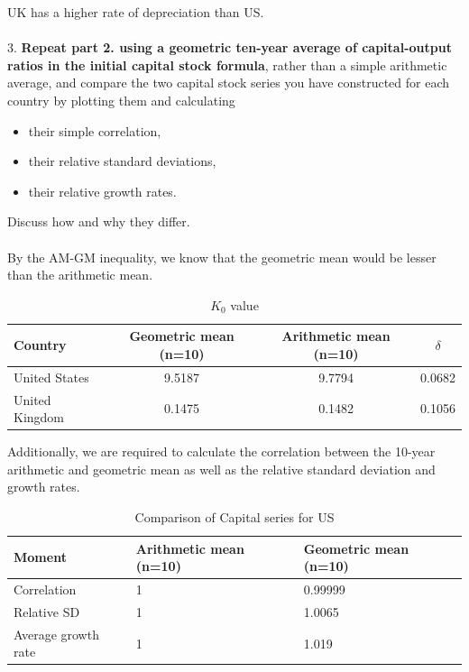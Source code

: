 \documentclass[11pt]{article}
\theoremstyle{mytheoremstyle}
\theoremstyle{mytheoremstyle}
\theoremstyle{myproblemstyle}
\begin{document}
UK has a higher rate of depreciation than US.
\\ \\ 
3. \textbf{Repeat part 2. using a geometric ten-year average of capital-output ratios in the initial capital stock formula}, rather than a simple arithmetic average, and compare the two capital stock series you have constructed for each country by plotting them and calculating
\begin{itemize}
    \item their simple correlation,
    \item their relative standard deviations,
    \item their relative growth rates.
\end{itemize}

Discuss how and why they differ.
\\ \\
By the AM-GM inequality, we know that the geometric mean would be lesser than the arithmetic mean.

\begin{table}[h]
    \centering
    \caption{$K_0$ value }
    \label{tab:table-1}
    \begin{tabular}{@{}lccc@{}}
    \toprule
    Country & Geometric mean (n=10) & Arithmetic mean (n=10) & $\delta$ \\ \midrule
    United States & 9.5187 & 9.7794 & 0.0682 \\
    United Kingdom & 0.1475 & 0.1482 & 0.1056 \\ \bottomrule
    \end{tabular}
    \end{table}

Additionally, we are required to calculate the correlation between the 10-year arithmetic and geometric mean as well as the relative standard deviation and growth rates. 

\begin{table}[htbp]
    \centering
    \caption{Comparison of Capital series for US}
    \label{tab:US_K}
    \begin{tabular}{@{}lll@{}}
    \toprule
    Moment & Arithmetic mean (n=10) & Geometric mean (n=10) \\ \midrule
    Correlation & 1 & 0.99999 \\
    Relative SD & 1 & 1.0065 \\
    Average growth rate & 1 & 1.019 \\ \bottomrule
    \end{tabular}
    \end{table}
\end{document}
